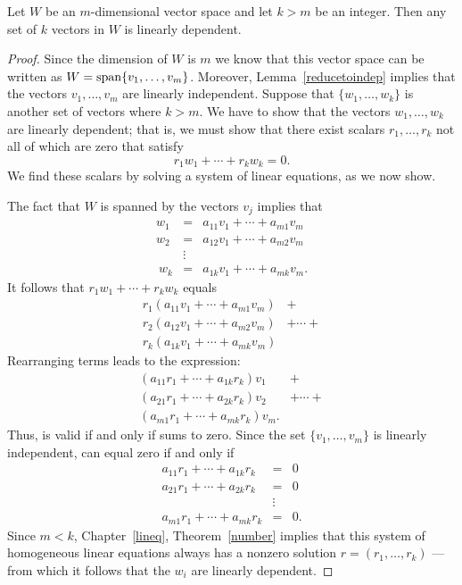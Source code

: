 \documentclass{ximera}
\begin{document}
\begin{lemma}  \label{lem:lindep}
Let $W$ be an $m$-dimensional vector space and let $k>m$ be an integer.
Then any set of $k$ vectors in $W$ is linearly dependent.
\end{lemma} 

\begin{proof} Since the dimension of $W$ is $m$ we know that
this vector space can be written as $W={\rm span}\{v_1,\ldots,v_m\}$.
Moreover, Lemma~\ref{reducetoindep} implies that the vectors
$v_1,\ldots,v_m$ are linearly independent.  Suppose that
$\{w_1,\ldots,w_k\}$ is another set of vectors where $k>m$.
We have to show that the vectors $w_1,\ldots,w_k$ are linearly
dependent; that is, we must show that there exist scalars
$r_1,\ldots,r_k$ not all of which are zero that satisfy
\begin{equation} \label{independence1}
r_1w_1 + \cdots + r_kw_k = 0.
\end{equation}
We find these scalars by solving a system of linear equations, as
we now show.

The fact that $W$ is spanned by the vectors $v_j$ implies that
\begin{eqnarray*}
w_1 & = & a_{11}v_1 + \cdots + a_{m1}v_m\ \\
w_2 & = & a_{12}v_1 + \cdots + a_{m2}v_m\ \\
 & \vdots & \\\
w_k & = & a_{1k}v_1 + \cdots + a_{mk}v_m.
\end{eqnarray*}
It follows that $r_1w_1 + \cdots + r_kw_k$ equals
\[
\begin{array}{ll}
r_1(a_{11}v_1 + \cdots + a_{m1}v_m) & +  \\
r_2(a_{12}v_1 + \cdots + a_{m2}v_m) & + \cdots + \\
r_k(a_{1k}v_1 + \cdots + a_{mk}v_m) &
\end{array}
\]
Rearranging terms leads to the expression:
\begin{equation}   \label{e:r1v1etc}
\begin{array}{ll}
(a_{11}r_1 + \cdots + a_{1k}r_k)v_1\ & + \\
(a_{21}r_1 + \cdots + a_{2k}r_k)v_2\ & + \cdots + \\
(a_{m1}r_1 + \cdots + a_{mk}r_k)v_m. &
\end{array}
\end{equation}
Thus,  is valid if and only if 
sums to zero.  Since the set $\{v_1,\ldots,v_m\}$ is linearly
independent, \Ref{e:r1v1etc} can equal zero if and only if
\begin{eqnarray*}
a_{11}r_1 + \cdots + a_{1k}r_k & = & 0\ \\
a_{21}r_1 + \cdots + a_{2k}r_k & = & 0\ \\
          & \vdots &   \\
a_{m1}r_1 + \cdots + a_{mk}r_k & = & 0.
\end{eqnarray*}
Since $m<k$, Chapter~\ref{lineq}, Theorem~\ref{number} implies that
this system of homogeneous linear equations always has a nonzero
solution $r=(r_1,\ldots,r_k)$ --- from which it follows that the
$w_i$ are linearly dependent.  \end{proof}
\end{document}
